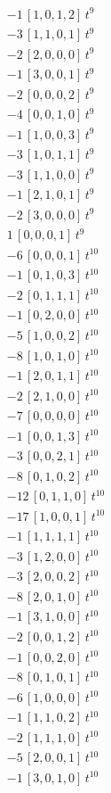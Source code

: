 \begin{align*}
-1\,[1,0,1,2]\,t^{9} \\
-3\,[1,1,0,1]\,t^{9} \\
-2\,[2,0,0,0]\,t^{9} \\
-1\,[3,0,0,1]\,t^{9} \\
-2\,[0,0,0,2]\,t^{9} \\
-4\,[0,0,1,0]\,t^{9} \\
-1\,[1,0,0,3]\,t^{9} \\
-3\,[1,0,1,1]\,t^{9} \\
-3\,[1,1,0,0]\,t^{9} \\
-1\,[2,1,0,1]\,t^{9} \\
-2\,[3,0,0,0]\,t^{9} \\
1\,[0,0,0,1]\,t^{9} \\
-6\,[0,0,0,1]\,t^{10} \\
-1\,[0,1,0,3]\,t^{10} \\
-2\,[0,1,1,1]\,t^{10} \\
-1\,[0,2,0,0]\,t^{10} \\
-5\,[1,0,0,2]\,t^{10} \\
-8\,[1,0,1,0]\,t^{10} \\
-1\,[2,0,1,1]\,t^{10} \\
-2\,[2,1,0,0]\,t^{10} \\
-7\,[0,0,0,0]\,t^{10} \\
-1\,[0,0,1,3]\,t^{10} \\
-3\,[0,0,2,1]\,t^{10} \\
-8\,[0,1,0,2]\,t^{10} \\
-12\,[0,1,1,0]\,t^{10} \\
-17\,[1,0,0,1]\,t^{10} \\
-1\,[1,1,1,1]\,t^{10} \\
-3\,[1,2,0,0]\,t^{10} \\
-3\,[2,0,0,2]\,t^{10} \\
-8\,[2,0,1,0]\,t^{10} \\
-1\,[3,1,0,0]\,t^{10} \\
-2\,[0,0,1,2]\,t^{10} \\
-1\,[0,0,2,0]\,t^{10} \\
-8\,[0,1,0,1]\,t^{10} \\
-6\,[1,0,0,0]\,t^{10} \\
-1\,[1,1,0,2]\,t^{10} \\
-2\,[1,1,1,0]\,t^{10} \\
-5\,[2,0,0,1]\,t^{10} \\
-1\,[3,0,1,0]\,t^{10}
\end{align*}
